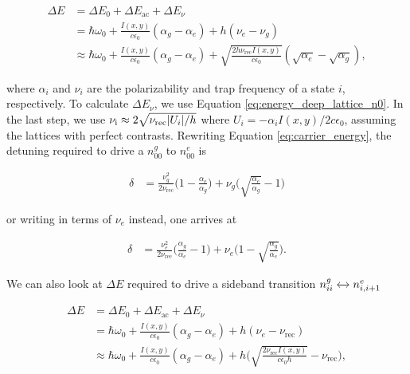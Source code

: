 	\begin{align}
	\Delta E&=\Delta E_{0}+\Delta E_{\text{ac}} + \Delta E_{\nu} \nonumber\\ 
	&=\hbar\omega_0+ \frac{I(x,y)}{c\epsilon_0}(\alpha_g-\alpha_e)+h(\nu_e-\nu_g) \nonumber \nonumber\\
	&\approx\hbar\omega_0+ \frac{I(x,y)}{c\epsilon_0}(\alpha_g-\alpha_e)+
	\sqrt{\frac{2h\nu_{\text{rec}}I(x,y)}{c\epsilon_{0}}}(\sqrt{\alpha_e}-\sqrt{\alpha_g}),
	\label{eq:carrier_energy}
	\end{align}

	\noindent where $\alpha_{i}$ and $\nu_{i}$ are the polarizability and trap frequency of a state $i$, respectively. To calculate $\Delta E_{\nu}$, we use Equation \ref{eq:energy_deep_lattice_n0}. In the last step, we use $\nu_{\text{i}}\approx 2\sqrt{\nu_{\text{rec}}\abs{U_{i}}/h}$ where $U_{i}=-\alpha_{i}I(x,y)/2c\epsilon_0$, assuming the lattices with perfect contrasts. Rewriting Equation \ref{eq:carrier_energy}, the detuning required to drive a $n^{g}_{00}$ to $n^{e}_{00}$ is 


	\begin{align}
	\delta&=\frac{\nu^{2}_g}{2\nu_{\text{rec}}}\bigg(1-\frac{\alpha_e}{\alpha_g}\bigg) + \nu_g\bigg(\sqrt{\frac{\alpha_e}{\alpha_g}}-1\bigg)
	\label{eq:carrier_freq_vg}
	\end{align}

	\noindent or writing in terms of $\nu_e$ instead, one arrives at 

	\begin{align}
	\delta&=\frac{\nu^{2}_e}{2\nu_{\text{rec}}}\bigg(\frac{\alpha_g}{\alpha_e}-1\bigg) + \nu_e\bigg(1-\sqrt{\frac{\alpha_g}{\alpha_e}}\bigg).
	\label{eq:carrier_freq_ve}
	\end{align}


	\noindent We can also look at $\Delta E$ required to drive a sideband transition $n^{g}_{ii} \xleftrightarrow{} n^{e}_{i,i+1}$


	\begin{align}
	\Delta E&=\Delta E_{0}+\Delta E_{\text{ac}} + \Delta E_{\nu} \nonumber \\ 
	&=\hbar\omega_0+ \frac{I(x,y)}{c\epsilon_0}(\alpha_g-\alpha_e)+h(\nu_e-\nu_{\text{rec}}) \nonumber \\
	&\approx\hbar\omega_0+ \frac{I(x,y)}{c\epsilon_0}(\alpha_g-\alpha_e)+h\bigg(\sqrt{\frac{2\nu_{\text{rec}}I(x,y)}{c\epsilon_0 h}}-\nu_{\text{rec}}\bigg),
	\end{align}

